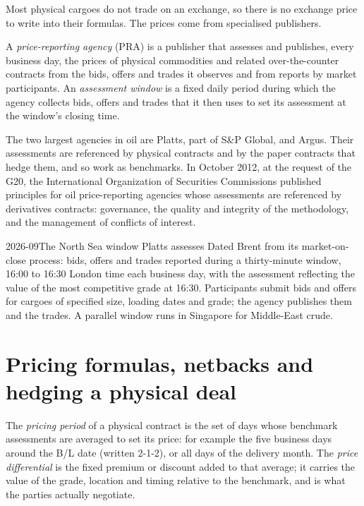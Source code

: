 Most physical cargoes do not trade on an exchange, so there is no exchange price
to write into their formulas. The prices come from specialised publishers.

\begin{definition}\label{def:m3:physical-commodity-markets:pra}
A \emph{price-reporting agency} (PRA) is a publisher
that assesses and publishes, every business day, the prices of physical commodities
and related over-the-counter contracts from the bids, offers and trades it observes
and from reports by market participants. An \emph{assessment
window} is a fixed daily period during which the agency
collects bids, offers and trades that it then uses to set its assessment at the
window's closing time.
\end{definition}

The two largest agencies in oil are Platts, part of S\&P Global, and Argus. Their
assessments are referenced by physical contracts and by the paper contracts that
hedge them, and so work as benchmarks. In October 2012, at the request of the
G20, the International Organization of Securities Commissions published
principles for oil price-reporting agencies whose assessments are referenced by
derivatives contracts: governance, the quality and integrity of the methodology,
and the management of conflicts of interest.

\begin{dated}{2026-09}{The North Sea window}\label{dat:m3:physical-commodity-markets:moc}
Platts assesses Dated Brent from its market-on-close process: bids, offers and trades
reported during a thirty-minute window, 16:00 to 16:30 London time each business day,
with the assessment reflecting the value of the most competitive grade at 16:30.
Participants submit bids and offers for cargoes of specified size, loading dates and
grade; the agency publishes them and the trades. A parallel window runs in Singapore
for Middle-East crude.
\end{dated}

\section{Pricing formulas, netbacks and hedging a physical deal}

\begin{definition}\label{def:m3:physical-commodity-markets:formula}
The \emph{pricing period} of a physical contract is the set of
days whose benchmark assessments are averaged to set its price: for example the five
business days around the B/L date (written 2-1-2), or all days of the delivery
month. The \emph{price differential} is the fixed premium
or discount added to that average; it carries the value of the grade, location and
timing relative to the benchmark, and is what the parties actually negotiate.
\end{definition}

